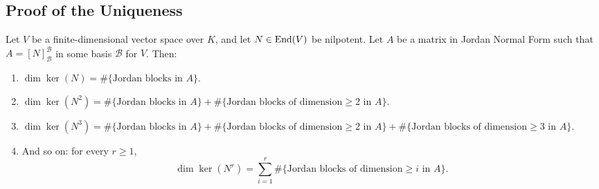 \subsection{Proof of the Uniqueness}

\begin{lemma}
\label{lem:counting_blocks_by_kernels}
Let $V$ be a finite-di\-men\-sional vector space over $K$, and let $N \in \operatorname{End}(V)$ be nilpotent. Let $A$ be a matrix in Jordan Normal Form such that $A = [N]_{\mathcal{B}}^{\mathcal{B}}$ in some basis $\mathcal{B}$ for $V$. Then:
\begin{enumerate}[label=\textbf{(\alph*)}]
    \item $\dim \ker(N) = \#\{\text{Jordan blocks in } A\}$.
    \item $\dim \ker(N^2) = \#\{\text{Jordan blocks in } A\} + \#\{\text{Jordan blocks of dimension} \ge 2 \text{ in } A\}$.
    \item $\dim \ker(N^3) = \#\{\text{Jordan blocks in } A\} + \#\{\text{Jordan blocks of dimension} \ge 2 \text{ in } A\} + \#\{\text{Jordan blocks of dimension} \ge 3 \text{ in } A\}$.
    \item And so on: for every $r \ge 1$,
    \[
        \dim \ker(N^r) = \sum_{i=1}^{r} \#\{\text{Jordan blocks of dimension} \ge i \text{ in } A\}.
    \]
\end{enumerate}
\end{lemma}


